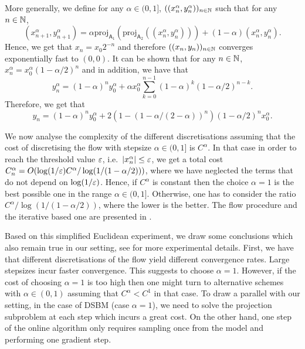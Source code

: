 \documentclass{article}
\begin{document}
More generally, we define for any $\alpha \in (0, 1]$,  $((x_n^\alpha, y_n^\alpha))_{n \in \mathbb{N}}$ such that for any $n \in \mathbb{N}$, 
\begin{equation}
    (x_{n+1}^\alpha, y_{n+1}^\alpha) = \alpha \mathrm{proj}_{\mathsf{A}_1}(\mathrm{proj}_{\mathsf{A}_2}((x_n^\alpha,y_n^\alpha))) + (1-\alpha)  (x_{n}^\alpha, y_{n}^\alpha) .
\end{equation}
Hence, we get that $x_n = x_0 2^{-n}$ and therefore $((x_n, y_n))_{n \in \mathbb{N}}$ converges exponentially fast to $(0,0)$. It can be shown that for any $n \in \mathbb{N}$, $x_n^\alpha =x_0^\alpha (1 - \alpha /2)^n$ and in addition, we have that 
\begin{equation}
     y_n^\alpha = (1-\alpha)^n y_0^\alpha + \alpha x_0^\alpha  \sum_{k=0}^{n-1} (1-\alpha)^k (1-\alpha/2)^{n-k} .
\end{equation}
Therefore, we get that 
\begin{equation}
    y_n = (1-\alpha)^{n}y_0^\alpha + 2 (1 - (1 - \alpha/(2-\alpha))^n)(1-\alpha/2)^n x_0^\alpha . 
\end{equation}

We now analyse the complexity of the different discretisations assuming that the cost of discretising the flow with stepsize $\alpha \in (0,1]$ is $C^\alpha$. In that case in order to reach the threshold value $\varepsilon$, i.e.~$| x_n^\alpha | \leq \varepsilon$, we get a total cost $C^\alpha_n = O(\log(1/\varepsilon)C^\alpha/\log(1/(1-\alpha/2)))$, where we have neglected the terms that do not depend on $\log(1/\varepsilon)$. Hence, if $C^\alpha$ is constant then the choice $\alpha = 1$ is the best possible one in the range $\alpha \in (0,1]$. Otherwise, one has to consider the ratio $C^\alpha / \log(1/(1-\alpha/2))$, where the lower is the better. The flow procedure and the iterative based one are presented in .

Based on this simplified Euclidean experiment, we draw some conclusions which also remain true in our setting, see  for more experimental details. First, we have that different discretisations of the flow yield different convergence rates. Large stepsizes incur faster convergence. This suggests to choose $\alpha =1$. However, if the cost of choosing $\alpha =1$ is too high then one might turn to alternative schemes with $\alpha \in (0,1)$ assuming that $C^\alpha < C^1$ in that case. To draw a parallel with our setting, in the case of DSBM (case $\alpha =1$), we need to solve the projection subproblem  at each step which incurs a great cost. On the other hand, one step of the online algorithm only requires sampling once from the model and performing one gradient step.
 
\end{document}
